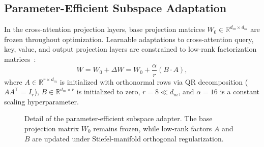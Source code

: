 \documentclass[journal,10pt,twocolumn]{IEEEtran}
\begin{document}
\subsection{Parameter-Efficient Subspace Adaptation}
\label{sec:peft_subspace}
In the cross-attention projection layers, base projection matrices $W_0 \in \mathbb{R}^{d_m \times d_m}$ are frozen throughout optimization. Learnable adaptations to cross-attention query, key, value, and output projection layers are constrained to low-rank factorization matrices~\cite{hu2022lora}:
\begin{equation}
    W = W_0 + \Delta W = W_0 + \frac{\alpha}{r} (B \cdot A),
    \label{eq:lora}
\end{equation}
where $A \in \mathbb{R}^{r \times d_m}$ is initialized with orthonormal rows via QR decomposition ($A A^\top = I_r$), $B \in \mathbb{R}^{d_m \times r}$ is initialized to zero, $r=8 \ll d_m$, and $\alpha=16$ is a constant scaling hyperparameter.

\begin{figure}[!h]
\centering
{}
\caption{Detail of the parameter-efficient subspace adapter. The base projection matrix $W_0$ remains frozen, while low-rank factors $A$ and $B$ are updated under Stiefel-manifold orthogonal regularization.}
\label{fig:adapter}
\end{figure}
\end{document}
